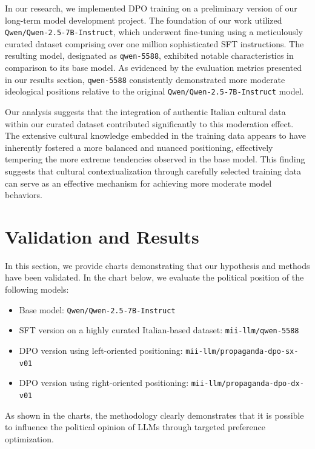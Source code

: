 \documentclass[10pt]{article}
\begin{document}
In our research, we implemented DPO training on a preliminary version of our long-term model development project. The foundation of our work utilized \texttt{Qwen/Qwen-2.5-7B-Instruct}, which underwent fine-tuning using a meticulously curated dataset comprising over one million sophisticated SFT instructions. The resulting model, designated as \texttt{qwen-5588}, exhibited notable characteristics in comparison to its base model. As evidenced by the evaluation metrics presented in our results section, \texttt{qwen-5588} consistently demonstrated more moderate ideological positions relative to the original \texttt{Qwen/Qwen-2.5-7B-Instruct} model. 

Our analysis suggests that the integration of authentic Italian cultural data within our curated dataset contributed significantly to this moderation effect. The extensive cultural knowledge embedded in the training data appears to have inherently fostered a more balanced and nuanced positioning, effectively tempering the more extreme tendencies observed in the base model. This finding suggests that cultural contextualization through carefully selected training data can serve as an effective mechanism for achieving more moderate model behaviors.

\section*{Validation and Results}

In this section, we provide charts demonstrating that our hypothesis and methods have been validated. In the chart below, we evaluate the political position of the following models:
\begin{itemize}
    \item Base model: \texttt{Qwen/Qwen-2.5-7B-Instruct}
    \item SFT version on a highly curated Italian-based dataset: \texttt{mii-llm/qwen-5588}
    \item DPO version using left-oriented positioning: \texttt{mii-llm/propaganda-dpo-sx-v01}
    \item DPO version using right-oriented positioning: \texttt{mii-llm/propaganda-dpo-dx-v01}
\end{itemize}

As shown in the charts, the methodology clearly demonstrates that it is possible to influence the political opinion of LLMs through targeted preference optimization.
\end{document}
